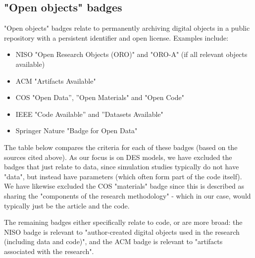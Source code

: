 \newpage
\subsection{"Open objects" badges}

"Open objects" badges relate to permanently archiving digital objects in a public repository with a persistent identifier and open license.\autocite{niso_reproducibility_badging_and_definitions_working_group_reproducibility_2021} Examples include:
\begin{itemize}
    \item NISO "Open Research Objects (ORO)" and "ORO-A" (if all relevant objects available)\autocite{niso_reproducibility_badging_and_definitions_working_group_reproducibility_2021}
    \item ACM "Artifacts Available"\autocite{association_for_computing_machinery_acm_artifact_2020}
    \item COS "Open Data”, ”Open Materials" and "Open Code"\autocite{blohowiak_badges_2023}
    \item IEEE "Code Available” and ”Datasets Available"\autocite{institute_of_electrical_and_electronics_engineers_ieee_about_nodate}
    \item Springer Nature "Badge for Open Data"\autocite{springer_nature_springer_2018}
\end{itemize}

The table below compares the criteria for each of these badges (based on the sources cited above). As our focus is on DES models, we have excluded the badges that just relate to data, since simulation studies typically do not have "data", but instead have parameters (which often form part of the code itself). We have likewise excluded the COS "materials" badge since this is described as sharing the "components of the research methodology" - which in our case, would typically just be the article and the code.

The remaining badges either specifically relate to code, or are more broad: the NISO badge is relevant to "author-created digital objects used in the research (including data and code)",\autocite{niso_reproducibility_badging_and_definitions_working_group_reproducibility_2021} and the ACM badge is relevant to "artifacts associated with the research".\autocite{association_for_computing_machinery_acm_artifact_2020}

